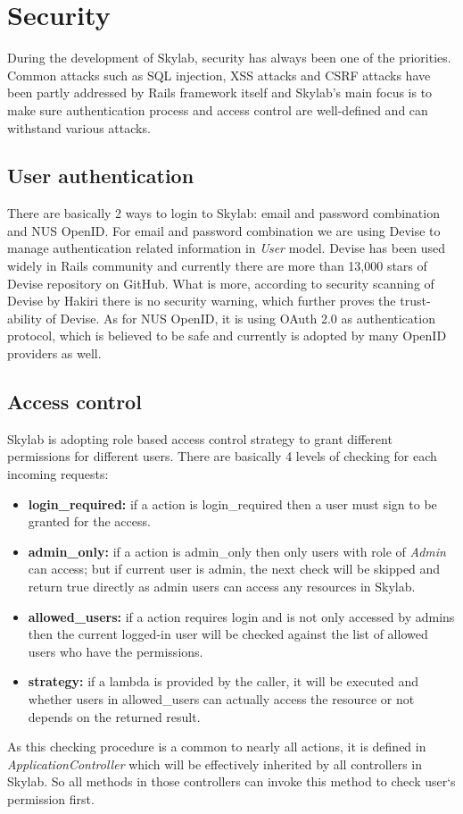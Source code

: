 \chapter{Security} \label{security}

During the development of Skylab, security has always been one of the priorities. Common attacks such as SQL injection, XSS attacks and CSRF attacks have been partly addressed by Rails framework itself and Skylab's main focus is to make sure authentication process and access control are well-defined and can withstand various attacks.

\section{User authentication}

There are basically 2 ways to login to Skylab: email and password combination and NUS OpenID. For email and password combination we are using Devise to manage authentication related information in \textit{User} model. Devise has been used widely in Rails community and currently there are more than 13,000 stars of Devise repository on GitHub\cite{citationdevise}. What is more, according to security scanning of Devise by Hakiri there is no security warning, which further proves the trust-ability of Devise\cite{citationdevisehakiri}. As for NUS OpenID, it is using OAuth 2.0 as authentication protocol, which is believed to be safe and currently is adopted by many OpenID providers as well\cite{citationnusopenid}.

\section{Access control}

Skylab is adopting role based access control strategy to grant different permissions for different users. There are basically 4 levels of checking for each incoming requests:

\begin{itemize}
  \item \textbf{login\_required:} if a action is login\_required then a user must sign to be granted for the access.
  \item \textbf{admin\_only:} if a action is admin\_only then only users with role of \textit{Admin} can access; but if current user is admin, the next check will be skipped and return true directly as admin users can access any resources in Skylab.
  \item \textbf{allowed\_users:} if a action requires login and is not only accessed by admins then the current logged-in user will be checked against the list of allowed users who have the permissions.
  \item \textbf{strategy:} if a lambda is provided by the caller, it will be executed and whether users in allowed\_users can actually access the resource or not depends on the returned result.
\end{itemize}

As this checking procedure is a common to nearly all actions, it is defined in \textit{ApplicationController} which will be effectively inherited by all controllers in Skylab. So all methods in those controllers can invoke this method to check user`s permission first.
